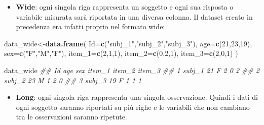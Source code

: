 \documentclass[
]{book}
\newenvironment{Shaded}{\begin{snugshade}}{\end{snugshade}}
\newcommand{\CommentTok}[1]{\textcolor[rgb]{0.56,0.35,0.01}{\textit{#1}}}
\newcommand{\DataTypeTok}[1]{\textcolor[rgb]{0.13,0.29,0.53}{#1}}
\newcommand{\DecValTok}[1]{\textcolor[rgb]{0.00,0.00,0.81}{#1}}
\newcommand{\KeywordTok}[1]{\textcolor[rgb]{0.13,0.29,0.53}{\textbf{#1}}}
\newcommand{\NormalTok}[1]{#1}
\newcommand{\StringTok}[1]{\textcolor[rgb]{0.31,0.60,0.02}{#1}}
\providecommand{\tightlist}{%
  \setlength{\itemsep}{0pt}\setlength{\parskip}{0pt}}
\begin{document}
\begin{itemize}
\tightlist
\item
  \textbf{Wide}: ogni singola riga rappresenta un soggetto e ogni sua risposta o variabile misurata sarà riportata in una diversa colonna. Il dataset creato in precedenza era infatti proprio nel formato wide:
\end{itemize}

\begin{Shaded}
\begin{Highlighting}[]
\NormalTok{data_wide<-}\KeywordTok{data.frame}\NormalTok{(}
  \DataTypeTok{Id=}\KeywordTok{c}\NormalTok{(}\StringTok{"subj_1"}\NormalTok{,}\StringTok{"subj_2"}\NormalTok{,}\StringTok{"subj_3"}\NormalTok{),}
  \DataTypeTok{age=}\KeywordTok{c}\NormalTok{(}\DecValTok{21}\NormalTok{,}\DecValTok{23}\NormalTok{,}\DecValTok{19}\NormalTok{),}
  \DataTypeTok{sex=}\KeywordTok{c}\NormalTok{(}\StringTok{"F"}\NormalTok{,}\StringTok{"M"}\NormalTok{,}\StringTok{"F"}\NormalTok{),}
  \DataTypeTok{item_1=}\KeywordTok{c}\NormalTok{(}\DecValTok{2}\NormalTok{,}\DecValTok{1}\NormalTok{,}\DecValTok{1}\NormalTok{),}
  \DataTypeTok{item_2=}\KeywordTok{c}\NormalTok{(}\DecValTok{0}\NormalTok{,}\DecValTok{2}\NormalTok{,}\DecValTok{1}\NormalTok{),}
  \DataTypeTok{item_3=}\KeywordTok{c}\NormalTok{(}\DecValTok{2}\NormalTok{,}\DecValTok{0}\NormalTok{,}\DecValTok{1}\NormalTok{)}
\NormalTok{  )}

\NormalTok{data_wide}
\CommentTok{##       Id age sex item_1 item_2 item_3}
\CommentTok{## 1 subj_1  21   F      2      0      2}
\CommentTok{## 2 subj_2  23   M      1      2      0}
\CommentTok{## 3 subj_3  19   F      1      1      1}
\end{Highlighting}
\end{Shaded}

\begin{itemize}
\tightlist
\item
  \textbf{Long}: ogni singola riga rappresenta una singola osservazione. Quindi i dati di ogni soggetto saranno riportati su più righe e le variabili che non cambiano tra le osservazioni saranno ripetute.
\end{itemize}
\end{document}
